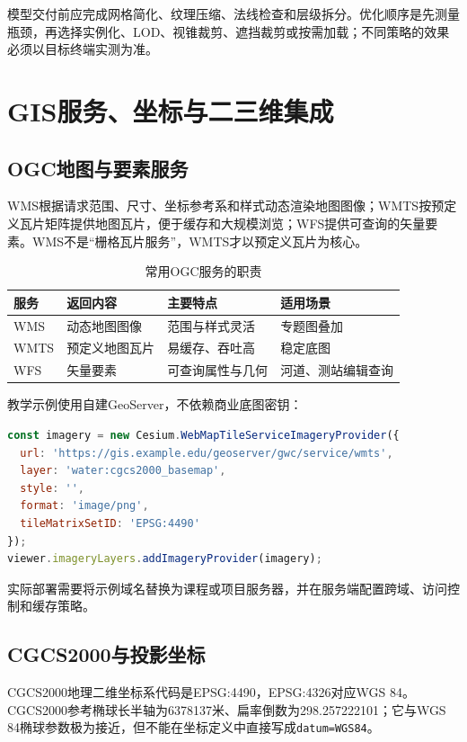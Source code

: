 模型交付前应完成网格简化、纹理压缩、法线检查和层级拆分。优化顺序是先测量瓶颈，再选择实例化、LOD、视锥裁剪、遮挡裁剪或按需加载；不同策略的效果必须以目标终端实测为准。

\section{GIS服务、坐标与二三维集成}

\subsection{OGC地图与要素服务}

WMS根据请求范围、尺寸、坐标参考系和样式动态渲染地图图像；WMTS按预定义瓦片矩阵提供地图瓦片，便于缓存和大规模浏览；WFS提供可查询的矢量要素。WMS不是“栅格瓦片服务”，WMTS才以预定义瓦片为核心\cite{ogcWMS,ogcWMTS}。

\begin{table}[htbp]
\centering
\caption{常用OGC服务的职责}
\label{tab:ogc-services}
\begin{tabular}{llll}
\toprule
服务 & 返回内容 & 主要特点 & 适用场景 \\
\midrule
WMS & 动态地图图像 & 范围与样式灵活 & 专题图叠加 \\
WMTS & 预定义地图瓦片 & 易缓存、吞吐高 & 稳定底图 \\
WFS & 矢量要素 & 可查询属性与几何 & 河道、测站编辑查询 \\
\bottomrule
\end{tabular}
\end{table}

教学示例使用自建GeoServer，不依赖商业底图密钥：

\begin{lstlisting}[language=JavaScript]
const imagery = new Cesium.WebMapTileServiceImageryProvider({
  url: 'https://gis.example.edu/geoserver/gwc/service/wmts',
  layer: 'water:cgcs2000_basemap',
  style: '',
  format: 'image/png',
  tileMatrixSetID: 'EPSG:4490'
});
viewer.imageryLayers.addImageryProvider(imagery);
\end{lstlisting}

实际部署需要将示例域名替换为课程或项目服务器，并在服务端配置跨域、访问控制和缓存策略。

\subsection{CGCS2000与投影坐标}

CGCS2000地理二维坐标系代码是EPSG:4490\cite{epsg4490}，EPSG:4326对应WGS 84。CGCS2000参考椭球长半轴为6378137米、扁率倒数为298.257222101；它与WGS 84椭球参数极为接近，但不能在坐标定义中直接写成\texttt{datum=WGS84}。

